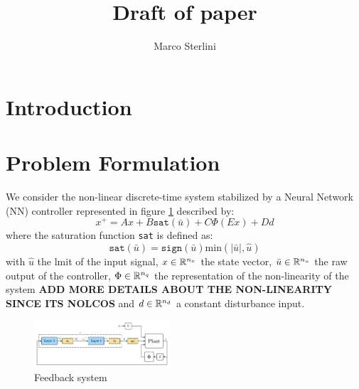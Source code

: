 \documentclass{article}
\begin{document}
\title{Draft of paper}

\author{Marco Sterlini}


\section{Introduction}

\section{Problem Formulation}
We consider the non-linear discrete-time system stabilized by a Neural Network (NN) controller represented in figure \ref{fig:first_scheme} described by:
\begin{equation}
  x^{+} = A x + B \texttt{sat}(\bar{u}) + C \Phi(E x) + D d 
\end{equation}
where the saturation function \texttt{sat} is defined as:
$$
    \texttt{sat}(\bar{u}) = \texttt{sign}(\bar{u})\text{min}(|\bar{u}|, \hat{u})
$$
with $\hat{u}$ the lmit of the input signal, $x \in {\mathbb{R}}^{n_x}$ the state vector, $\bar{u} \in {\mathbb{R}}^{n_u}$ the raw output of the controller, $\Phi \in {\mathbb{R}}^{n_q}$ the representation of the non-linearity of the system \textbf{ADD MORE DETAILS ABOUT THE NON-LINEARITY SINCE ITS NOLCOS} and $d \in {\mathbb{R}}^{n_d}$ a constant disturbance input.

\begin{figure}[H]
    \centering
    \includegraphics[width=0.45\textwidth]{img/first_scheme}
    \caption{Feedback system}
    \label{fig:first_scheme}
\end{figure}
\end{document}

